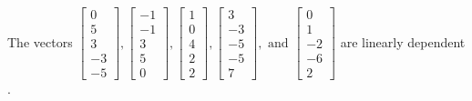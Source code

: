 \begin{exercise}
\begin{exerciseStatement}
  \end{exerciseStatement}
  \begin{exerciseAnswer}
   The vectors \(\left[\begin{array}{r}
0 \\
5 \\
3 \\
-3 \\
-5
\end{array}\right] , \left[\begin{array}{r}
-1 \\
-1 \\
3 \\
5 \\
0
\end{array}\right] , \left[\begin{array}{r}
1 \\
0 \\
4 \\
2 \\
2
\end{array}\right] , \left[\begin{array}{r}
3 \\
-3 \\
-5 \\
-5 \\
7
\end{array}\right] , \text{ and } \left[\begin{array}{r}
0 \\
1 \\
-2 \\
-6 \\
2
\end{array}\right]\) are 
  	 linearly dependent  .
  


  \end{exerciseAnswer}
\end{exercise}